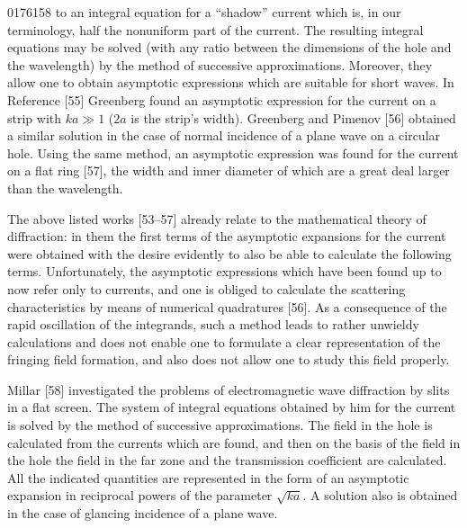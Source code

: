 \begin{scanpage}{0176}{158}
to an integral equation for a ``shadow'' current which is, in our terminology, half the nonuniform part of the current. The resulting integral equations may be solved (with any ratio between the dimensions of the hole and the wavelength) by the method of successive approximations. Moreover, they allow one to obtain asymptotic expressions which are suitable for short waves. In Reference [55] Greenberg found an asymptotic expression for the current on a strip with $ka\gg1$ ($2a$ is the strip's width). Greenberg and Pimenov [56] obtained a similar solution in the case of normal incidence of a plane wave on a circular hole. Using the same method, an asymptotic expression was found for the current on a flat ring [57], the width and inner diameter of which are a great deal larger than the wavelength.

The above listed works [53--57] already relate to the mathematical theory of diffraction: in them the first terms of the asymptotic expansions for the current were obtained with the desire evidently to also be able to calculate the following terms. Unfortunately, the asymptotic expressions which have been found up to now refer only to currents, and one is obliged to calculate the scattering characteristics by means of numerical quadratures [56]. As a consequence of the rapid oscillation of the integrands, such a method leads to rather unwieldy calculations and does not enable one to formulate a clear representation of the fringing field formation, and also does not allow one to study this field properly.

Millar [58] investigated the problems of electromagnetic wave diffraction by slits in a flat screen. The system of integral equations obtained by him for the current is solved by the method of successive approximations. The field in the hole is calculated from the currents which are found, and then on the basis of the field in the hole the field in the far zone and the transmission coefficient are calculated. All the indicated quantities are represented in the form of an asymptotic expansion in reciprocal powers of the parameter $\sqrt{ka}$. A solution also is obtained in the case of glancing incidence of a plane wave.
\end{scanpage}
